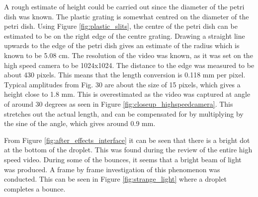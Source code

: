 A rough estimate of height could be carried out since the diameter of the petri dish was known. The plastic grating is somewhat centred on the diameter of the petri dish. Using Figure \ref{fig:plastic_slits}, the centre of the petri dish can be estimated to be on the right edge of the centre grating. Drawing a straight line upwards to the edge of the petri dish gives an estimate of the radius which is known to be 5.08 cm. The resolution of the video was known, as it was set on the high speed camera to be 1024x1024. The distance to the edge was measured to be about 430 pixels. This means that the length conversion is 0.118 mm per pixel. Typical amplitudes from Fig. 30 are about the size of 15 pixels, which gives a height close to 1.8 mm. This is overestimated as the video was captured at angle of around 30 degrees as seen in Figure \ref{fig:closeup_highspeedcamera}. This stretches out the actual length, and can be compensated for by multiplying by the sine of the angle, which gives around 0.9 mm.  

From Figure \ref{fig:after_effects_interface} it can be seen that there is a bright dot at the bottom of the droplet. This was found during the review of the entire high speed video. During some of the bounces, it seems that a bright beam of light was produced. A frame by frame investigation of this phenomenon was conducted. This can be seen in Figure \ref{fig:strange_light} where a droplet completes a bounce.

